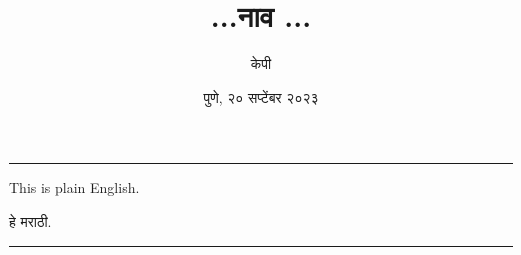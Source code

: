 \documentclass[17pt]{extarticle}  %
\begin{document}
\title{...नाव ...}
\author{केपी}
\date{पुणे, २० सप्टेंबर २०२३}
\maketitle
\vspace{5mm}
\hrule

\begin{english}
This is plain English.
\end{english}

हे मराठी.
\vspace{5mm}
\hrule
\end{document}
